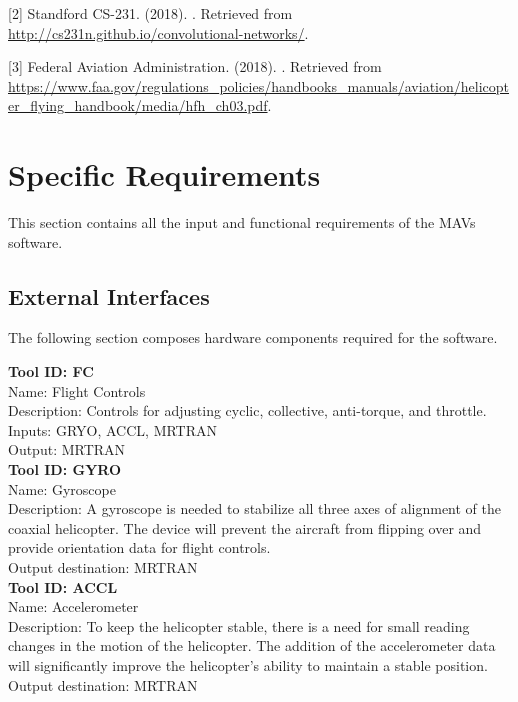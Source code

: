 \documentclass[onecolumn, oneside, letterpaper, draftclsnofoot, 10pt, compsoc]{IEEEtran}
\begin{document}
[2]
\newblock Standford CS-231. (2018).
.
\newblock Retrieved from \url{http://cs231n.github.io/convolutional-networks/}.

[3]
\newblock Federal Aviation Administration. (2018).
.
\newblock Retrieved from \url{https://www.faa.gov/regulations_policies/handbooks_manuals/aviation/helicopter_flying_handbook/media/hfh_ch03.pdf}.

\section{Specific Requirements}
This section contains all the input and functional requirements of the MAV\textquotesingle s software.

\subsection{External Interfaces}
The following section composes hardware components required for the software.

\noindent
\textbf{Tool ID: FC}\\
Name: Flight Controls\\
Description: Controls for adjusting cyclic, collective, anti-torque, and throttle.\\
Inputs: GRYO, ACCL, MRTRAN\\
Output: MRTRAN\\

\noindent
\textbf{Tool ID: GYRO}\\
Name: Gyroscope\\
Description: A gyroscope is needed to stabilize all three axes of alignment of the coaxial helicopter. The device will prevent the aircraft from flipping over and provide orientation data for flight controls.\\
Output destination: MRTRAN\\

\noindent
\textbf{Tool ID: ACCL}\\
Name: Accelerometer\\
Description: To keep the helicopter stable, there is a need for small reading changes in the motion of the helicopter. The addition of the accelerometer data will significantly improve the helicopter’s ability to maintain a stable position.\\
Output destination: MRTRAN\\
\end{document}
